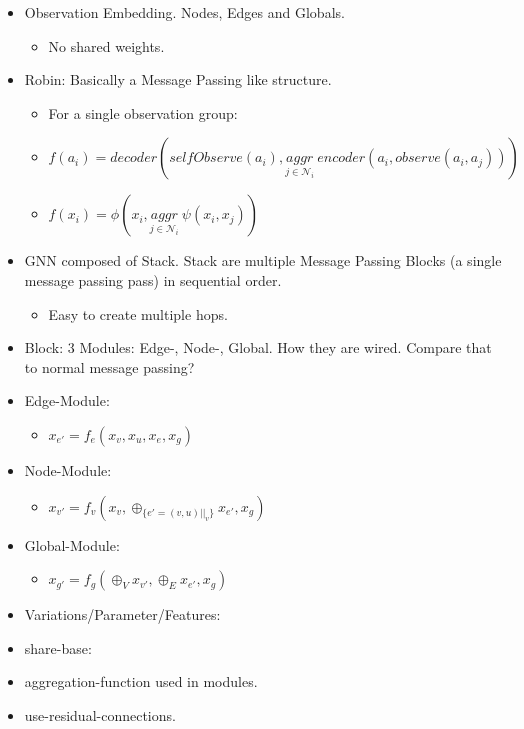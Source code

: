 \begin{itemize}[noitemsep,nolistsep]
    \item Observation Embedding. Nodes, Edges and Globals.
    \begin{itemize}[noitemsep,nolistsep]
        \item No shared weights.
    \end{itemize}
    \item Robin: Basically a Message Passing like structure.
    \begin{itemize}[noitemsep,nolistsep]
        \item For a single observation group:
        \item $f(a_i) = decoder(selfObserve(a_i), \underset{j \in \mathcal{N}_i}{aggr}\ encoder(a_i, observe(a_i, a_j)))$
        \item $f(x_i) = \phi(x_i, \underset{j \in \mathcal{N}_i}{aggr}\ \psi(x_i, x_j))$
    \end{itemize}
    \item GNN composed of Stack. Stack are multiple Message Passing Blocks (a single message passing pass) in sequential order.
    \begin{itemize}[noitemsep,nolistsep]
        \item Easy to create multiple hops.
    \end{itemize}
    \item Block: 3 Modules: Edge-, Node-, Global. How they are wired. Compare that to normal message passing?
    \item Edge-Module:
    \begin{itemize}[noitemsep,nolistsep]
        \item $x_{e'} = f_e(x_v, x_u, x_e, x_g)$
    \end{itemize}
    \item Node-Module:
    \begin{itemize}[noitemsep,nolistsep]
        \item $x_{v'} = f_v(x_v, \oplus_{\{e'=(v,u)||_v\}} x_{e'}, x_g)$
    \end{itemize}
    \item Global-Module:
    \begin{itemize}[noitemsep,nolistsep]
        \item $x_{g'} = f_g(\oplus_V x_{v'}, \oplus_E x_{e'}, x_g)$
    \end{itemize}
    \item Variations/Parameter/Features:
    \item share-base:
    \item aggregation-function used in modules.
    \item use-residual-connections.
\end{itemize}

